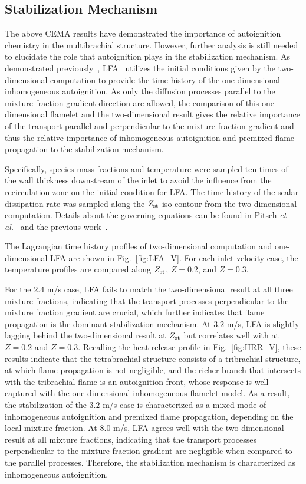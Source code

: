 \documentclass{wssci}
\begin{document}
\subsection{Stabilization Mechanism} 
The above CEMA results have demonstrated the importance of autoignition chemistry in the multibrachial structure.  However, further analysis is still needed to elucidate the role that autoignition plays in the stabilization mechanism.  As demonstrated previously~\cite{deng15}, LFA~\cite{pitsch98a} utilizes the initial conditions given by the two-dimensional computation to provide the time history of the one-dimensional inhomogeneous autoignition.  As only the diffusion processes parallel to the mixture fraction gradient direction are allowed, the comparison of this one-dimensional flamelet and the two-dimensional result gives the relative importance of the transport parallel and perpendicular to the mixture fraction gradient and thus the relative importance of inhomogeneous autoignition and premixed flame propagation to the stabilization mechanism.

Specifically, species mass fractions and temperature were sampled ten times of the wall thickness downstream of the inlet to avoid the influence from the recirculation zone on the initial condition for LFA.  The time history of the scalar dissipation rate was sampled along the $Z_{\rm st}$ iso-contour from the two-dimensional computation.  Details about the governing equations can be found in Pitsch \emph{et al.}~\cite{pitsch98a} and the previous work~\cite{deng15}.

The Lagrangian time history profiles of two-dimensional computation and one-dimensional LFA are shown in Fig.~\ref{fig:LFA_V}.  For each inlet velocity case, the temperature profiles are compared along $Z_{\rm st}$, $Z = 0.2$, and $Z = 0.3$.  

For the $2.4$ m/s case, LFA fails to match the two-dimensional result at all three mixture fractions, indicating that the transport processes perpendicular to the mixture fraction gradient are crucial, which further indicates that flame propagation is the dominant stabilization mechanism.  At $3.2$ m/s, LFA is slightly lagging behind the two-dimensional result at $Z_{\rm st}$ but correlates well with at $Z = 0.2$ and $Z = 0.3$.  Recalling the heat release profile in Fig.~\ref{fig:HRR_V}, these results indicate that the tetrabrachial structure consists of a tribrachial structure, at which flame propagation is not negligible, and the richer branch that intersects with the tribrachial flame is an autoignition front, whose response is well captured with the one-dimensional inhomogeneous flamelet model.  As a result, the stabilization of the $3.2$ m/s case is characterized as a mixed mode of inhomogeneous autoignition and premixed flame propagation, depending on the local mixture fraction.  At $8.0$ m/s, LFA agrees well with the two-dimensional result at all mixture fractions, indicating that the transport processes perpendicular to the mixture fraction gradient are negligible when compared to the parallel processes.  Therefore, the stabilization mechanism is characterized as inhomogeneous autoignition.
\end{document}
